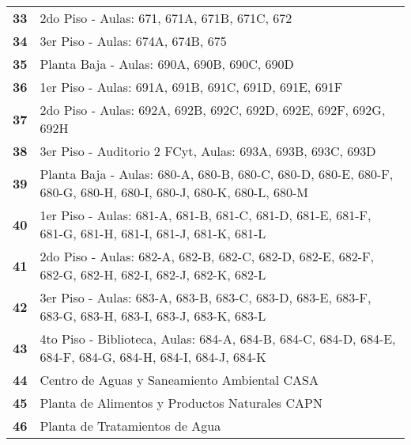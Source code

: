 \begin{longtable}{ c  X }
      \textbf{33}
      &
      2{\tiny do} Piso - Aulas: 671, 671A, 671B, 671C, 672
      \\

      \textbf{34}
      &
      3{\tiny er} Piso - Aulas: 674A, 674B, 675
      \\

      \textbf{35}
      &
      Planta Baja - Aulas: 690A, 690B, 690C, 690D
      \\

      \textbf{36}
      &
      1{\tiny er} Piso - Aulas: 691A, 691B, 691C, 691D, 691E, 691F
      \\

      \textbf{37}
      &
      2{\tiny do} Piso - Aulas: 692A, 692B, 692C, 692D, 692E, 692F, 692G, 692H
      \\

      \textbf{38}
      &
      3{\tiny er} Piso - Auditorio 2 FCyt, Aulas: 693A, 693B, 693C, 693D
      \\

      \textbf{39}
      &
      Planta Baja - Aulas: 680-A, 680-B, 680-C, 680-D, 680-E, 680-F, 680-G, 680-H, 680-I, 680-J, 680-K, 680-L, 680-M
      \\

      \textbf{40}
      &
      1{\tiny er} Piso - Aulas: 681-A, 681-B, 681-C, 681-D, 681-E, 681-F, 681-G, 681-H, 681-I, 681-J, 681-K, 681-L
      \\

      \textbf{41}
      &
      2{\tiny do} Piso - Aulas: 682-A, 682-B, 682-C, 682-D, 682-E, 682-F, 682-G, 682-H, 682-I, 682-J, 682-K, 682-L
      \\

      \textbf{42}
      &
      3{\tiny er} Piso - Aulas: 683-A, 683-B, 683-C, 683-D, 683-E, 683-F, 683-G, 683-H, 683-I, 683-J, 683-K, 683-L
      \\

      \textbf{43}
      &
      4{\tiny to} Piso - Biblioteca, Aulas: 684-A, 684-B, 684-C, 684-D, 684-E, 684-F, 684-G, 684-H, 684-I, 684-J, 684-K
      \\

      \textbf{44}
      &
      Centro de Aguas y Saneamiento Ambiental CASA
      \\

      \textbf{45}
      &
      Planta de Alimentos y Productos Naturales CAPN
      \\


      \textbf{46}
      &
      Planta de Tratamientos de Agua
      \\



\end{longtable}
